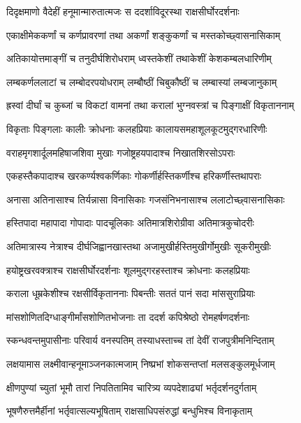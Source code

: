 \twolineshloka
{दिदृक्षमाणो वैदेहीं हनूमान्मारुतात्मजः}
{स ददर्शाविदूरस्था राक्षसीर्घोरदर्शनाः} %

\twolineshloka
{एकाक्षीमेककर्णां च कर्णप्रावरणां तथा}
{अकर्णां शङ्कुकर्णां च मस्तकोच्छ्वासनासिकाम्} %

\twolineshloka
{अतिकायोत्तमाङ्गीं च तनुदीर्घशिरोधराम्}
{ध्वस्तकेशीं तथाकेशीं केशकम्बलधारिणीम्} %

\twolineshloka
{लम्बकर्णललाटां च लम्बोदरपयोधराम्}
{लम्बौष्ठीं चिबुकौष्ठीं च लम्बास्यां लम्बजानुकाम्} %

\twolineshloka
{ह्रस्वां दीर्घां च कुब्जां च विकटां वामनां तथा}
{करालां भुग्नवस्त्रां च पिङ्गाक्षीं विकृताननाम्} %

\twolineshloka
{विकृताः पिङ्गलाः कालीः क्रोधनाः कलहप्रियाः}
{कालायसमहाशूलकूटमुद्गरधारिणीः} %

\twolineshloka
{वराहमृगशार्दूलमहिषाजशिवा मुखाः}
{गजोष्ट्रहयपादाश्च निखातशिरसोऽपराः} %

\twolineshloka
{एकहस्तैकपादाश्च खरकर्ण्यश्वकर्णिकाः}
{गोकर्णीर्हस्तिकर्णीश्च हरिकर्णीस्तथापराः} %

\twolineshloka
{अनासा अतिनासाश्च तिर्यन्नासा विनासिकाः}
{गजसंनिभनासाश्च ललाटोच्छ्वासनासिकाः} %

\twolineshloka
{हस्तिपादा महापादा गोपादाः पादचूलिकाः}
{अतिमात्रशिरोग्रीवा अतिमात्रकुचोदरीः} %

\twolineshloka
{अतिमात्रास्य नेत्राश्च दीर्घजिह्वानखास्तथा}
{अजामुखीर्हस्तिमुखीर्गोमुखीः सूकरीमुखीः} %

\twolineshloka
{हयोष्ट्रखरवक्त्राश्च राक्षसीर्घोरदर्शनाः}
{शूलमुद्गरहस्ताश्च क्रोधनाः कलहप्रियाः} %

\twolineshloka
{कराला धूम्रकेशीश्च रक्षसीर्विकृताननाः}
{पिबन्तीः सततं पानं सदा मांससुराप्रियाः} %

\twolineshloka
{मांसशोणितदिग्धाङ्गीर्मांसशोणितभोजनाः}
{ता ददर्श कपिश्रेष्ठो रोमहर्षणदर्शनाः} %

\twolineshloka
{स्कन्धवन्तमुपासीनाः परिवार्य वनस्पतिम्}
{तस्याधस्ताच्च तां देवीं राजपुत्रीमनिन्दिताम्} %

\twolineshloka
{लक्षयामास लक्ष्मीवान्हनूमाञ्जनकात्मजाम्}
{निष्प्रभां शोकसन्तप्तां मलसङ्कुलमूर्धजाम्} %

\twolineshloka
{क्षीणपुण्यां च्युतां भूमौ तारां निपतितामिव}
{चारित्र्य व्यपदेशाढ्यां भर्तृदर्शनदुर्गताम्} %

\twolineshloka
{भूषणैरुत्तमैर्हीनां भर्तृवात्सल्यभूषिताम्}
{राक्षसाधिपसंरुद्धां बन्धुभिश्च विनाकृताम्} %

